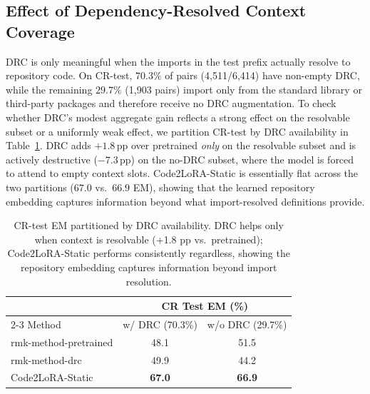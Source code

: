 \documentclass{llmxive}
\providecommand{\UseMacro}[1]{\csname rmk-#1\endcsname}
\providecommand{\codelora}{Code2LoRA\xspace}
\providecommand{\codelorastatic}{\codelora-Static\xspace}
\begin{document}
\subsection{Effect of Dependency-Resolved Context Coverage}
\label{app:oracle_coverage}

DRC is only meaningful when the imports in the test prefix actually resolve to repository code.
On CR-test, $70.3\%$ of pairs (4{,}511/6{,}414) have non-empty DRC, while the remaining $29.7\%$ (1{,}903 pairs) import only from the standard library or third-party packages and therefore receive no DRC augmentation.
To check whether DRC's modest aggregate gain reflects a strong effect on the resolvable subset or a uniformly weak effect, we partition CR-test by DRC availability in Table~\ref{tab:oracle_coverage}.
DRC adds $+1.8$\,pp over pretrained \emph{only} on the resolvable subset and is actively destructive ($-7.3$\,pp) on the no-DRC subset, where the model is forced to attend to empty context slots.
\codelorastatic{} is essentially flat across the two partitions ($67.0$ vs.\ $66.9$ EM), showing that the learned repository embedding captures information beyond what import-resolved definitions provide.

\begin{table}[t]
\begin{small}
\begin{center}
{
\setlength{\tabcolsep}{4pt}
\small

\begin{tabular}{@{}lcc@{}}
\toprule
& \multicolumn{2}{c}{CR Test EM (\%)} \\
\cmidrule(lr){2-3}
Method & w/ DRC (70.3\%) & w/o DRC (29.7\%) \\
\midrule
\UseMacro{method-pretrained} & 48.1 & 51.5 \\
\UseMacro{method-drc} & 49.9 & 44.2 \\
\codelorastatic{} & \textbf{67.0} & \textbf{66.9} \\
\bottomrule
\end{tabular}
}

\end{center}
\end{small}
\caption{CR-test EM partitioned by DRC availability. DRC helps only when context is resolvable (+1.8 pp vs.\ pretrained); \codelorastatic{} performs consistently regardless, showing the repository embedding captures information beyond import resolution.}
\label{tab:oracle_coverage}
\end{table}
\end{document}
